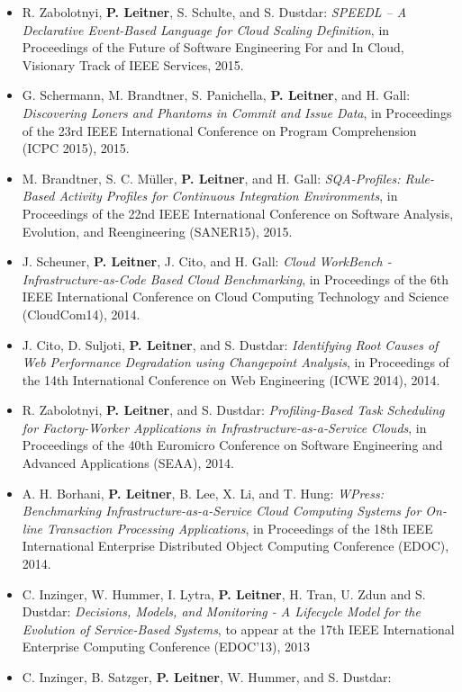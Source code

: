 \documentclass[paper=letter,fontsize=11pt]{scrartcl} %
\begin{document}
\begin{itemize}
      \item R. Zabolotnyi, \textbf{P. Leitner}, S. Schulte, and S. Dustdar: \emph{SPEEDL -- A Declarative Event-Based Language for Cloud Scaling Definition}, in Proceedings of the Future of Software Engineering For and In Cloud, Visionary Track of IEEE Services, 2015.
  \item G. Schermann, M. Brandtner, S. Panichella, \textbf{P. Leitner}, and H. Gall: \emph{Discovering Loners and Phantoms in Commit and Issue Data}, in Proceedings of the 23rd IEEE International Conference
on Program Comprehension (ICPC 2015), 2015.
  \item M. Brandtner, S. C. M\"uller, \textbf{P. Leitner}, and H. Gall: \emph{SQA-Profiles: Rule-Based Activity Profiles for Continuous Integration Environments}, in Proceedings of the 22nd IEEE International Conference on Software Analysis, Evolution, and Reengineering (SANER15), 2015.
  \item J. Scheuner, \textbf{P. Leitner}, J. Cito, and H. Gall: \emph{Cloud WorkBench - Infrastructure-as-Code Based Cloud Benchmarking}, in Proceedings of the 6th IEEE International Conference on Cloud Computing Technology and Science (CloudCom14), 2014.
  \item J. Cito, D. Suljoti, \textbf{P. Leitner}, and S. Dustdar: \emph{Identifying Root Causes of Web Performance Degradation using Changepoint Analysis}, in Proceedings of the 14th International Conference on Web Engineering (ICWE 2014), 2014.
 \item R. Zabolotnyi, \textbf{P. Leitner}, and S. Dustdar: \emph{Profiling-Based Task Scheduling for Factory-Worker Applications in Infrastructure-as-a-Service Clouds}, in Proceedings of the 40th Euromicro Conference on Software Engineering and Advanced Applications (SEAA), 2014.
 \item A. H. Borhani, \textbf{P. Leitner}, B. Lee, X. Li, and T. Hung: \emph{WPress: Benchmarking Infrastructure-as-a-Service Cloud Computing Systems for On-line Transaction Processing Applications}, in Proceedings of the 18th IEEE International Enterprise Distributed Object Computing Conference (EDOC), 2014.
\item C. Inzinger, W. Hummer, I. Lytra, \textbf{P. Leitner}, H. Tran, U. Zdun and S. Dustdar: \emph{Decisions, Models, and Monitoring - A Lifecycle Model for the Evolution of Service-Based Systems}, to appear at the 17th IEEE International Enterprise Computing Conference (EDOC'13), 2013
\item C. Inzinger, B. Satzger, \textbf{P. Leitner}, W. Hummer, and S. Dustdar:

\end{itemize}
\end{document}
